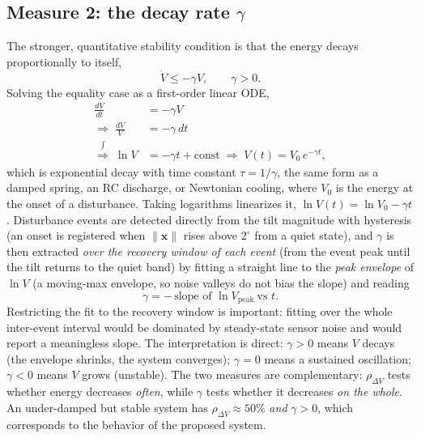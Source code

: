 \documentclass[conference]{IEEEtran}
\begin{document}
\subsection{Measure 2: the decay rate $\gamma$}
The stronger, quantitative stability condition is that the energy decays
proportionally to itself,
\begin{equation}
  \dot V\le-\gamma V,\qquad\gamma>0.
  \label{eq:gammacond}
\end{equation}
Solving the equality case as a first-order linear ODE,
\begin{equation}
  \begin{aligned}
    \frac{dV}{dt}                                    & = -\gamma V              \\
    \Rightarrow\;\frac{dV}{V}                        & = -\gamma\,dt            \\
    \overset{\textstyle\int}{\Longrightarrow}\;\ln V & = -\gamma t+\text{const}
    \;\Rightarrow\; V(t)=V_0\,e^{-\gamma t},
  \end{aligned}
\end{equation}
which is exponential decay with time constant $\tau=1/\gamma$, the same form as
a damped spring, an RC discharge, or Newtonian cooling, where $V_0$ is the
energy at the onset of a disturbance. Taking logarithms linearizes it,
$\ln V(t)=\ln V_0-\gamma t$. Disturbance events are detected directly from the
tilt magnitude with hysteresis (an onset is registered when $\lVert\mathbf
  x\rVert$ rises above $2^\circ$ from a quiet state), and $\gamma$ is then extracted
\emph{over the recovery window of each event} (from the event peak until the
tilt returns to the quiet band) by fitting a straight line to the \emph{peak
  envelope} of $\ln V$ (a moving-max envelope, so noise valleys do not bias the
slope) and reading
\begin{equation}
  \gamma=-\,\text{slope of }\ln V_\text{peak}\ \text{vs }t.
\end{equation}
Restricting the fit to the recovery window is important: fitting over the whole
inter-event interval would be dominated by steady-state sensor noise and would
report a meaningless slope.
The interpretation is direct: $\gamma>0$ means $V$ decays (the envelope shrinks,
the system converges); $\gamma=0$ means a sustained oscillation; $\gamma<0$
means $V$ grows (unstable). The two measures are complementary:
$\rho_{\Delta V}$ tests whether energy decreases \emph{often}, while $\gamma$
tests whether it decreases \emph{on the whole}. An under-damped but stable
system has $\rho_{\Delta V}\approx 50\%$ \emph{and} $\gamma>0$, which corresponds
to the behavior of the proposed system.
\end{document}

